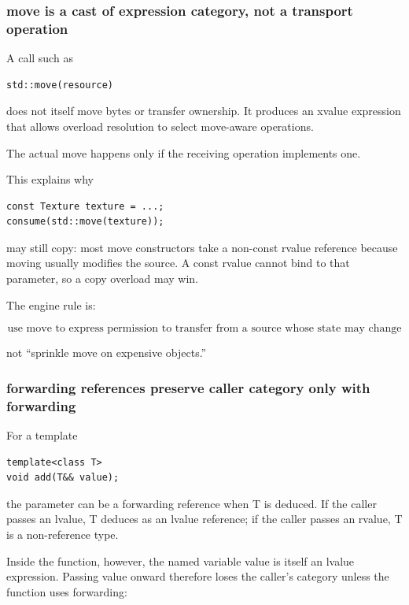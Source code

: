 \subsubsection{move is a cast of expression category, not a transport operation}\label{01-foundations-i-ch005-move-is-a-cast-of-expression-category-not-a-transport-operation}

A call such as

\begin{verbatim}
std::move(resource)
\end{verbatim}

does not itself move bytes or transfer ownership. It produces an xvalue expression that allows overload resolution to select move-aware operations.

The actual move happens only if the receiving operation implements one.

This explains why

\begin{verbatim}
const Texture texture = ...;
consume(std::move(texture));
\end{verbatim}

may still copy: most move constructors take a non-const rvalue reference because moving usually modifies the source. A const rvalue cannot bind to that parameter, so a copy overload may win.

The engine rule is:

\[
\boxed{
\text{use move to express permission to transfer from a source whose state may change}
}
\]

not ``sprinkle move on expensive objects.''

\subsubsection{forwarding references preserve caller category only with forwarding}\label{01-foundations-i-ch005-forwarding-references-preserve-caller-category-only-with-forwarding}

For a template

\begin{verbatim}
template<class T>
void add(T&& value);
\end{verbatim}

the parameter can be a forwarding reference when T is deduced. If the caller passes an lvalue, T deduces as an lvalue reference; if the caller passes an rvalue, T is a non-reference type.

Inside the function, however, the named variable value is itself an lvalue expression. Passing value onward therefore loses the caller's category unless the function uses forwarding:


